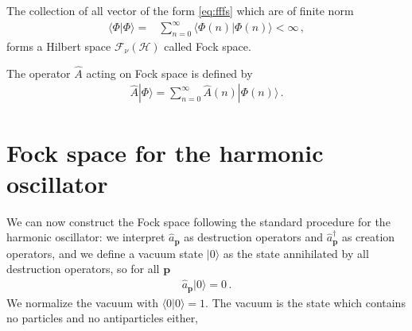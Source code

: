 The collection of all vector of the form \eqref{eq:fffs} which are of finite norm
\begin{align}
  \langle\Phi|\Phi\rangle=&\sum_{n=0}^{\infty}\langle\Phi(n)|\Phi(n)\rangle<\infty\,,
\end{align}
forms a Hilbert space $\mathcal{F}_{\nu}(\mathcal{H})$ called Fock space.

The operator  $\widehat{A}$ acting on Fock space is defined by
\begin{align}
\label{eq:Afi}
  \widehat{A}|\Phi\rangle=\sum_{n=0}^{\infty} \widehat{A}(n)|\Phi(n)\rangle\,.
\end{align}

\section{Fock space for the harmonic oscillator}
We can now construct the Fock space following the standard procedure
for the harmonic oscillator: we interpret $\widehat{a}_\mathbf{p}$ as destruction operators and $\widehat{a}_\mathbf{p}^\dagger$
as creation operators, and we define a vacuum state $|0\rangle$ as the state
annihilated by all destruction operators, so for all $\mathbf{p}$
\begin{align}
  \widehat{a}_\mathbf{p}|0\rangle=0\,.
\end{align}
We normalize the vacuum with $\langle0|0\rangle=1$. The vacuum is the state which contains no particles and no antiparticles either,

